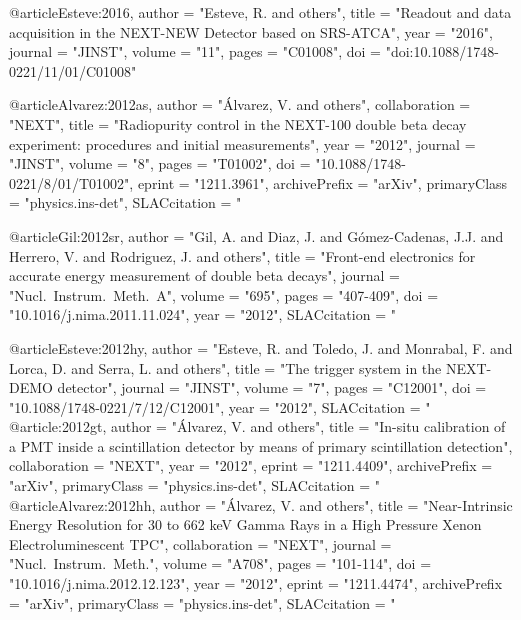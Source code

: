 {{@article{Esteve:2016,
      author        = "Esteve, R. and others",
      title         = "Readout and data acquisition in the NEXT-NEW Detector based on {SRS}-{ATCA}",
      year          = "2016",
      journal        = "JINST",
      volume         = "11",
      pages          = "C01008",
      doi            = "doi:10.1088/1748-0221/11/01/C01008"
}

@article{Alvarez:2012as,
      author         = "\'Alvarez, V. and others",
      collaboration = "NEXT",
      title          = "{Radiopurity control in the NEXT-100 double beta decay
                        experiment: procedures and initial measurements}",
      year           = "2012",
      journal        = "JINST",
      volume         = "8",
      pages          = "T01002",
      doi            = "10.1088/1748-0221/8/01/T01002",
      eprint         = "1211.3961",
      archivePrefix  = "arXiv",
      primaryClass   = "physics.ins-det",
      SLACcitation   = "%
}

@article{Gil:2012sr,
      author         = "Gil, A. and Diaz, J. and G\'omez-Cadenas, J.J. and Herrero,
                        V. and Rodriguez, J. and others",
      title          = "{Front-end electronics for accurate energy measurement of
                        double beta decays}",
      journal        = "Nucl.\ Instrum.\ Meth.\ A",
      volume         = "695",
      pages          = "407-409",
      doi            = "10.1016/j.nima.2011.11.024",
      year           = "2012",
      SLACcitation   = "%
}

@article{Esteve:2012hy,
      author         = "Esteve, R. and Toledo, J. and Monrabal, F. and Lorca, D.
                        and Serra, L. and others",
      title          = "{The trigger system in the NEXT-DEMO detector}",
      journal        = "JINST",
      volume         = "7",
      pages          = "C12001",
      doi            = "10.1088/1748-0221/7/12/C12001",
      year           = "2012",
      SLACcitation   = "%
}
@article{:2012gt,
      author         = "\'Alvarez, V. and others",
      title          = "{In-situ calibration of a PMT inside a scintillation
                        detector by means of primary scintillation detection}",
      collaboration  = "NEXT",
      year           = "2012",
      eprint         = "1211.4409",
      archivePrefix  = "arXiv",
      primaryClass   = "physics.ins-det",
      SLACcitation   = "%
}
@article{Alvarez:2012hh,
      author         = "\'Alvarez, V. and others",
      title          = "{Near-Intrinsic Energy Resolution for 30 to 662 keV Gamma
                        Rays in a High Pressure Xenon Electroluminescent TPC}",
      collaboration  = "NEXT",
      journal        = "Nucl.\ Instrum.\ Meth.",
      volume         = "A708",
      pages          = "101-114",
      doi            = "10.1016/j.nima.2012.12.123",
      year           = "2012",
      eprint         = "1211.4474",
      archivePrefix  = "arXiv",
      primaryClass   = "physics.ins-det",
      SLACcitation   = "%
}

}}
